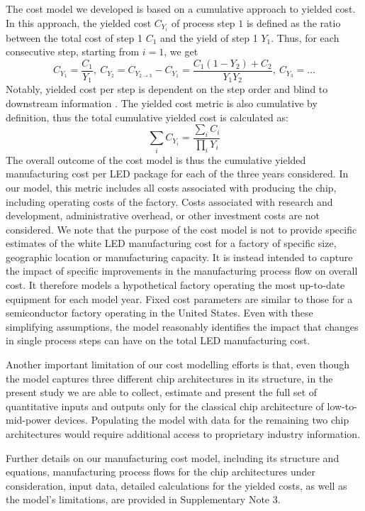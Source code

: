 \documentclass[parskip=full]{article}
\begin{document}
The cost model we developed is based on a cumulative approach to yielded cost\cite{becker2001use}. In this approach, the yielded cost $C_{Y_i}$ of process step $1$ is defined as the ratio between the total cost of step 1 $C_1$ and the yield of step 1 $Y_1$. Thus, for each consecutive step, starting from $i=1$, we get
%
\begin{equation}
    C_{Y_1} = \frac{C_1}{Y_1}, \ C_{Y_2} = C_{Y_{2 \rightarrow 3}} - C_{Y_1} = \frac{C_1(1-Y_2)+C_2}{Y_1Y_2}, \ C_{Y_3}=\dots
\end{equation}
%
Notably, yielded cost per step is dependent on the step order and blind to downstream information \cite{becker2001use}. The yielded cost metric is also cumulative by definition, thus the total cumulative yielded cost is calculated as:
%
\begin{equation}
    \sum_i C_{Y_i} = \frac{\sum_i C_i}{\prod_i Y_i}
\end{equation}
%
The overall outcome of the cost model is thus the cumulative yielded manufacturing cost per LED package for each of the three years considered. In our model, this metric includes all costs associated with producing the chip, including operating costs of the factory. Costs associated with research and development, administrative overhead, or other investment costs are not considered. We note that the purpose of the cost model is not to provide specific estimates of the white LED manufacturing cost for a factory of specific size, geographic location or manufacturing capacity. It is instead intended to capture the impact of specific improvements in the manufacturing process flow on overall cost. It therefore models a hypothetical factory operating the most up-to-date equipment for each model year. Fixed cost parameters are similar to those for a semiconductor factory operating in the United States. Even with these simplifying assumptions, the model reasonably identifies the impact that changes in single process steps can have on the total LED manufacturing cost.

Another important limitation of our cost modelling efforts is that, even though the model captures three different chip architectures in its structure, in the present study we are able to collect, estimate and present the full set of quantitative inputs and outputs only for the classical chip architecture of low-to-mid-power devices. Populating the model with data for the remaining two chip architectures would require additional access to proprietary industry information.

Further details on our manufacturing cost model, including its structure and equations, manufacturing process flows for the chip architectures under consideration, input data, detailed calculations for the yielded costs, as well as the model’s limitations, are provided in Supplementary Note 3.
\end{document}
